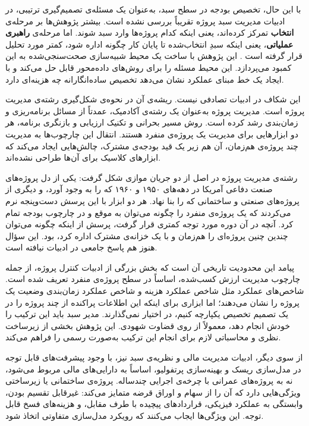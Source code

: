 با این حال، تخصیص بودجه در سطح سبد، به‌عنوان یک مسئله‌ی تصمیم‌گیری
ترتیبی، در ادبیات مدیریت سبد پروژه تقریباً بررسی نشده است.
بیشتر پژوهش‌ها بر مرحله‌ی \textbf{انتخاب} تمرکز کرده‌اند، یعنی اینکه
کدام پروژه‌ها وارد سبد شوند. اما مرحله‌ی \textbf{راهبری عملیاتی}،
یعنی اینکه سبدِ انتخاب‌شده تا پایان کار چگونه اداره شود،
کمتر مورد تحلیل قرار گرفته است
\citep{Archer1999, Cooper2001, Turner2014}.
این پژوهش با ساخت یک محیط شبیه‌سازی صحت‌سنجی‌شده به این کمبود
می‌پردازد. این محیط مسئله را برای روش‌های داده‌محور قابل حل می‌کند
و با ایجاد یک خط مبنای عملکرد نشان می‌دهد تخصیص ساده‌انگارانه
چه هزینه‌ای دارد.

این شکاف در ادبیات تصادفی نیست. ریشه‌ی آن در نحوه‌ی شکل‌گیری رشته‌ی
مدیریت پروژه است. مدیریت پروژه به‌عنوان یک رشته‌ی آکادمیک، عمدتاً
از مسائل برنامه‌ریزی و زمان‌بندی رشد کرده است. روش مسیر بحرانی و
تکنیک ارزیابی و بازنگری برنامه، هر دو ابزارهایی برای مدیریت یک
پروژه‌ی منفرد هستند. انتقال این چارچوب‌ها به مدیریت چند پروژه‌ی
هم‌زمان، آن هم زیر یک قید بودجه‌ی مشترک، چالش‌هایی ایجاد می‌کند که
ابزارهای کلاسیک برای آن‌ها طراحی نشده‌اند.

رشته‌ی مدیریت پروژه در اصل از دو جریان موازی شکل گرفت: یکی از دل
پروژه‌های صنعت دفاعی آمریکا در دهه‌های ۱۹۵۰ و ۱۹۶۰ که 
را به وجود آورد، و دیگری از پروژه‌های صنعتی و ساختمانی که 
را بنا نهاد. هر دو ابزار با این پرسش دست‌وپنجه نرم می‌کردند که
یک پروژه‌ی منفرد را چگونه می‌توان به موقع و در چارچوب بودجه تمام
کرد. آنچه در آن دوره مورد توجه کمتری قرار گرفت، پرسش از اینکه
چگونه می‌توان چندین چنین پروژه‌ای را هم‌زمان و با یک خزانه‌ی مشترک
اداره کرد، بود. این سؤال هنوز هم پاسخ جامعی در ادبیات نیافته است.

پیامد این محدودیت تاریخی آن است که بخش بزرگی از ادبیات کنترل
پروژه، از جمله چارچوب مدیریت ارزش کسب‌شده، اساساً در سطح
پروژه‌ی منفرد تعریف شده است. شاخص‌های عملکرد مثل شاخص عملکرد
هزینه و شاخص عملکرد زمان‌بندی وضعیت یک پروژه را نشان می‌دهند؛
اما ابزاری برای اینکه این اطلاعات پراکنده از چند پروژه را
در یک تصمیم تخصیص یکپارچه کنیم، در اختیار نمی‌گذارند.
مدیر سبد باید این ترکیب را خودش انجام دهد، معمولاً از روی قضاوت
شهودی. این پژوهش بخشی از زیرساخت نظری و محاسباتی لازم برای
انجام این ترکیب به‌صورت رسمی را فراهم می‌کند.

از سوی دیگر، ادبیات مدیریت مالی و نظریه‌ی سبد نیز، با وجود پیشرفت‌های
قابل توجه در مدل‌سازی ریسک و بهینه‌سازی پرتفولیو، اساساً به دارایی‌های
مالی مربوط می‌شود، نه به پروژه‌های عمرانی با چرخه‌ی اجرایی چندساله.
پروژه‌ی ساختمانی یا زیرساختی ویژگی‌هایی دارد که آن را از سهام و
اوراق قرضه متمایز می‌کند: غیرقابل تقسیم بودن، وابستگی به عملکرد
فیزیکی، قراردادهای پیچیده با طرف مقابل، و هزینه‌های فسخ قابل توجه.
این ویژگی‌ها ایجاب می‌کنند که رویکرد مدل‌سازی متفاوتی اتخاذ شود.

